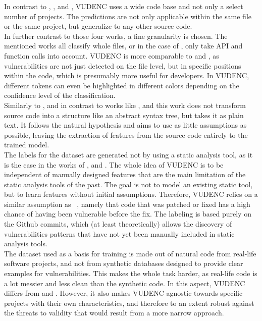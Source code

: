 \documentclass[
	a4paper,
	pagesize,
	pdftex,
	12pt,
	twoside, %
	BCOR=5mm, %
	ngerman,
	fleqn,
	final,
	]{scrartcl}
\begin{document}
In contrast to \cite{Li.2018}, \cite{Pang.2015}, \cite{Hovsepyan.2012} and \cite{Dam.2017}, VUDENC uses a wide code base and not only a select number of projects. The predictions are not only applicable within the same file or the same project, but generalize to any other source code.\\
In further contrast to those four works, a fine granularity is chosen. The mentioned works all classify whole files, or in the case of \cite{Li.2018}, only take API and function calls into account. VUDENC is more comparable to \cite{Russell.2018} and \cite{Ma.2017}, as vulnerabilities are not just detected on the file level, but in specific positions within the code, which is presumably more useful for developers. In VUDENC, different tokens can even be highlighted in different colors depending on the confidence level of the classification.\\
Similarly to \cite{Hovsepyan.2012}, and in contrast to works like \cite{Ma.2017}, \cite{Yamaguchi.2012} and \cite{Liu.2018}
this work does not transform source code into a structure like an abstract syntax tree, but takes it as plain text. It follows the natural hypothesis and aims to use as little assumptions as possible, leaving the extraction of features from the source code entirely to the trained model.\\
The labels for the dataset are generated not by using a static analysis tool, as it is the case in the works of \cite{Russell.2018}, \cite{Dam.2017} and \cite{Hovsepyan.2012}. The whole idea of VUDENC is to be independent of manually designed features that are the main limitation of the static analysis tools of the past. The goal is not to model an existing static tool, but to learn features without initial assumptions. Therefore, VUDENC relies on a similar assumption as ~\cite{Liu.2018}, namely that code that was patched or fixed has a high chance of having been vulnerable before the fix. The labeling is based purely on the Github commits, which (at least theoretically) allows the discovery of vulnerabilities patterns that have not yet been manually included in static analysis tools.\\
The dataset used as a basis for training is made out of natural code from real-life software projects, and not from synthetic databases designed to provide clear examples for vulnerabilities. This makes the whole task harder, as real-life code is a lot messier and less clean than the synthetic code. In this aspect, VUDENC differs from \cite{Russell.2018} and \cite{Li.2018}. However, it also makes VUDENC agnostic towards specific projects with their own characteristics, and therefore to an extent robust against the threats to validity that would result from a more narrow approach.\\
\end{document}
